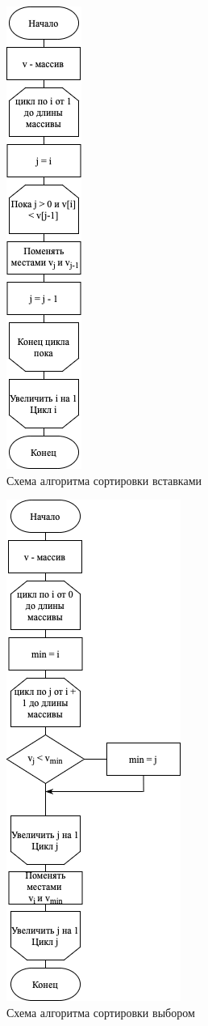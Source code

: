 \documentclass[14pt,russian]{scrartcl}
\begin{document}
\begin{figure}[h]
	\centering
	\includegraphics[scale=1]{insertion.png}
	\caption{Схема алгоритма сортировки вставками}
	\label{fig:insertion}
\end{figure}

\begin{figure}[h]
	\centering
	\includegraphics[scale=1]{selection.png}
	\caption{Схема алгоритма сортировки выбором}
	\label{fig:selection}
\end{figure}
\end{document}
